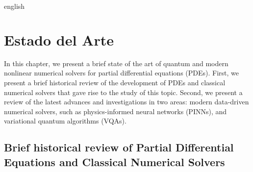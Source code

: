 \documentclass[../0000.tex]{subfiles}
\begin{document}

\begin{hyphenrules}{english}

\chapter{Estado del Arte}\label{ch:EstadoDelArte}

In this chapter, we present a brief state of the art of quantum and modern nonlinear numerical solvers for partial differential equations (PDEs). 
First, we present a brief historical review of the development of PDEs and classical numerical solvers that gave rise to the study of this topic. Second, 
we present a review of the latest advances and investigations in two areas: modern data-driven numerical solvers, such as physics-informed neural networks (PINNs), and 
variational quantum algorithms (VQAs).

\section{Brief historical review of Partial Differential Equations and Classical Numerical Solvers}\label{sec:BriefHistoricalReview}


\end{hyphenrules}
\end{document}
